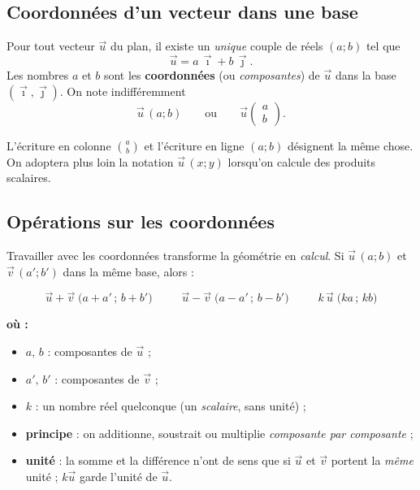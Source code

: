\documentclass[11pt,a4paper]{article}
\newenvironment{ou}{%
  \par\smallskip\noindent\textbf{où :}\nopagebreak
  \begin{itemize}[leftmargin=1.8em,topsep=2pt,itemsep=1.5pt,parsep=0pt]}%
  {\end{itemize}}
\begin{document}
\subsection{Coordonnées d'un vecteur dans une base}

\begin{theoreme}
Pour tout vecteur $\vec{u}$ du plan, il existe un \emph{unique} couple de réels $(a;b)$ tel que
\[
  \vec{u}=a\,\vec{\imath}+b\,\vec{\jmath}.
\]
Les nombres $a$ et $b$ sont les \textbf{coordonnées} (ou \emph{composantes}) de $\vec{u}$ dans la base
$(\vec{\imath},\vec{\jmath})$. On note indifféremment
\[
  \vec{u}\,(a;b)\qquad\text{ou}\qquad \vec{u}\begin{pmatrix} a\\ b\end{pmatrix}.
\]
\end{theoreme}

L'écriture en colonne $\binom{a}{b}$ et l'écriture en ligne $(a;b)$ désignent la même chose. On adoptera
plus loin la notation $\vec{u}\,(x;y)$ lorsqu'on calcule des produits scalaires.

\subsection{Opérations sur les coordonnées}

Travailler avec les coordonnées transforme la géométrie en \emph{calcul}. Si $\vec{u}\,(a;b)$ et
$\vec{v}\,(a';b')$ dans la même base, alors :

\begin{formule}
\[
  \boxed{\;\vec{u}+\vec{v}\;\bigl(a+a'\,;\,b+b'\bigr)\;}\qquad
  \boxed{\;\vec{u}-\vec{v}\;\bigl(a-a'\,;\,b-b'\bigr)\;}\qquad
  \boxed{\;k\,\vec{u}\;\bigl(ka\,;\,kb\bigr)\;}
\]
\begin{ou}
  \item $a,\,b$ : composantes de $\vec{u}$ ;
  \item $a',\,b'$ : composantes de $\vec{v}$ ;
  \item $k$ : un nombre réel quelconque (un \emph{scalaire}, sans unité) ;
  \item \textbf{principe} : on additionne, soustrait ou multiplie \emph{composante par composante} ;
  \item \textbf{unité} : la somme et la différence n'ont de sens que si $\vec{u}$ et $\vec{v}$ portent la
        \emph{même} unité ; $k\vec{u}$ garde l'unité de $\vec{u}$.
\end{ou}
\end{formule}
\end{document}
